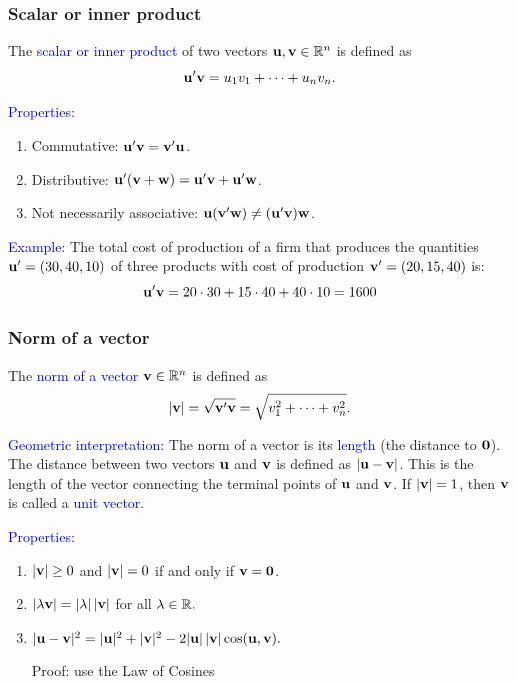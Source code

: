 \documentclass[11pt,aspectratio=169]{beamer}
\begin{document}
\begin{frame}
\frametitle{Scalar or inner product}
\begin{small}
The \textcolor{blue}{scalar or inner product} of two vectors ${\bf u}, {\bf v}\in \mathbb R^n$ is defined as
$$
{\bf u}' {\bf v}=u_1 v_1+\cdots +u_nv_n.
$$

\textcolor{blue}{Properties:}
\begin{enumerate}
\item Commutative: ${\bf u}' {\bf v}= {\bf v}' {\bf u}$.
\item Distributive: ${\bf u}' ({\bf v}+{\bf  w})={\bf u}' {\bf v}+{\bf u}' {\bf w}$.
\item Not necessarily associative: $\bf{u} ({\bf v}' {\bf w}) \neq ({\bf u}' {\bf v}) {\bf w}$.
\end{enumerate}
\vskip 12pt
\textcolor{blue}{Example:} The total cost of production of a firm that produces the quantities ${\bf u}'=(30,40,10)$ of three products with cost of production ${\bf v}'=(20,15, 40)$ is:
$$
{\bf u}' {\bf v}=20 \cdot 30+15 \cdot 40+ 40 \cdot 10=1600
$$


\end{small}
\end{frame}\begin{frame}
\frametitle{Norm of a vector}
\begin{small}
The \textcolor{blue}{norm of a vector} ${\bf v} \in \mathbb R^n$ is defined as
$$
\vert {\bf v}\vert=\sqrt{ {\bf v}' {\bf v}}=\sqrt{v_1^2+\dots+v^2_n}.
$$


\textcolor{blue}{Geometric interpretation:} The norm of a vector is its \textcolor{blue}{length} (the distance to ${\bf 0}$). The distance between two vectors 
${\bf u}$ and ${\bf v}$ is defined as $\vert {\bf u}-{\bf v}\vert$. This is the length of the vector connecting the terminal points of ${\bf u}$ and ${\bf v}$.
If  $\vert {\bf v} \vert=1$, then ${\bf v}$ is called a \textcolor{blue}{unit vector}.

\textcolor{blue}{Properties:}
\begin{enumerate}
\item $\vert {\bf v} \vert\geq 0$ and $\vert {\bf v} \vert =0$ if and only if ${\bf v}=\bf{0}$.
\item $\vert \lambda {\bf v} \vert = \vert \lambda \vert \, \vert {\bf v} \vert $ for all $\lambda \in \mathbb R.$


\item $
\vert {\bf u}- {\bf v}\vert^2=\vert {\bf u} \vert^2 +\vert {\bf v}\vert^2-2 \vert {\bf u} \vert \, \vert {\bf v}\vert \cos ({\bf u}, {\bf v}).
$ \begin{tiny}Proof: use the  Law of Cosines \end{tiny}



\end{enumerate}
\end{small}
\end{frame}
\end{document}
